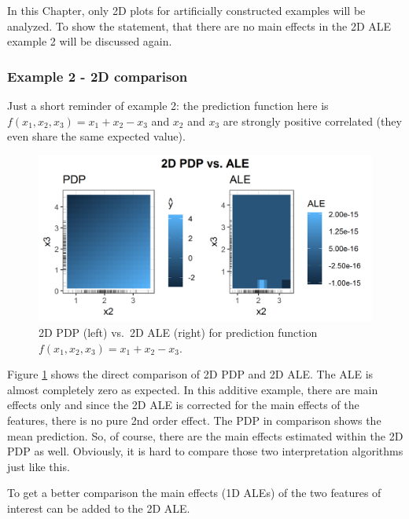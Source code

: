 \documentclass[]{krantz}
\begin{document}
In this Chapter, only 2D plots for artificially constructed examples
will be analyzed. To show the statement, that there are no main effects
in the 2D ALE example 2 will be discussed again.

\subsubsection{Example 2 - 2D
comparison}\label{example-2---2d-comparison}

Just a short reminder of example 2: the prediction function here is
\(f(x_1, x_2, x_3) = x_1 + x_2 - x_3\) and \(x_2\) and \(x_3\) are
strongly positive correlated (they even share the same expected value).

\begin{figure}
\includegraphics[width=1\linewidth]{images/ale_1_2d_comp_x1_plus_x2_minus_x3_150_0_2_0p5} \caption{2D PDP (left) vs.~2D ALE (right) for prediction
function \(f(x_1, x_2, x_3) = x_1 + x_2 - x_3\).}\label{fig:x1px2mx3ale2D}
\end{figure}




Figure \ref{fig:x1px2mx3ale2D} shows the direct comparison of 2D PDP and
2D ALE. The ALE is almost completely zero as expected. In this additive
example, there are main effects only and since the 2D ALE is corrected
for the main effects of the features, there is no pure 2nd order effect.
The PDP in comparison shows the mean prediction. So, of course, there
are the main effects estimated within the 2D PDP as well. Obviously, it
is hard to compare those two interpretation algorithms just like this.

To get a better comparison the main effects (1D ALEs) of the two
features of interest can be added to the 2D ALE.
\end{document}
